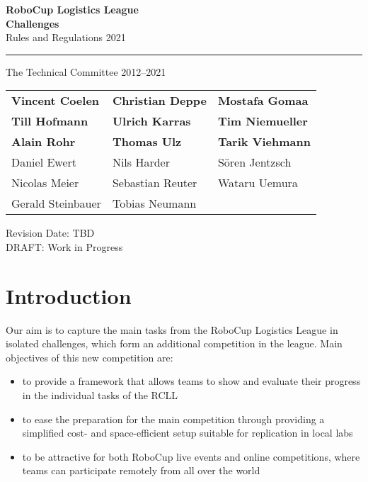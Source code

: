 \documentclass[12pt,twoside]{article}
\begin{document}
\begin{titlepage}
 \vspace*{5cm}
 \begin{center}
  \begin{LARGE}

   {\bf RoboCup Logistics League}\\[2ex]
   {\Large \bf{Challenges}}\\[4ex]
   {\Large Rules and Regulations 2021}\\[4ex]
  \end{LARGE}
  \hrule

  {\LARGE\vspace*{4ex}}
  \begin{Large}
   The Technical Committee 2012--2021\\[6ex]
  \end{Large}
  \begin{tabular}{lll}
   \textbf{Vincent Coelen}&\textbf{Christian Deppe}&\textbf{Mostafa Gomaa}\\
   \textbf{Till Hofmann}&\textbf{Ulrich Karras}&\textbf{Tim Niemueller}\\
   \textbf{Alain Rohr}&\textbf{Thomas Ulz}&\textbf{Tarik Viehmann}\\[.5em]

   Daniel Ewert&Nils Harder&S\"oren Jentzsch\\
   Nicolas Meier&Sebastian Reuter&Wataru Uemura\\
   Gerald Steinbauer&Tobias Neumann\\
  \end{tabular}
  \vfill
  Revision Date: \ac{TBD}\\
  DRAFT: Work in Progress %
 \end{center}
\end{titlepage}


\section{Introduction}
\label{sec:intro}
Our aim is to capture the main tasks from the RoboCup Logistics League in
isolated challenges, which form an additional competition in the league.
Main objectives of this new competition are:
\begin{itemize}
 \item to provide a framework that allows teams to show and evaluate their
       progress in the individual tasks of the RCLL
 \item to ease the preparation for the main competition through providing a
       simplified cost- and space-efficient setup suitable for replication in
       local labs
 \item to be attractive for both RoboCup live events and online competitions,
       where teams can participate remotely from all over the world
\end{itemize}
\end{document}
